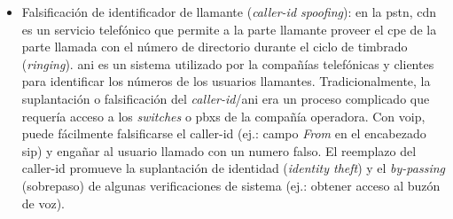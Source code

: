 \documentclass[a4paper,12pt]{report}
\begin{document}
\begin{itemize}
\item Falsificación de identificador de llamante (\emph{caller-id spoofing}): 
en la \ac{pstn}, \ac{cdn} es un servicio telefónico que permite a la parte llamante proveer el
\ac{cpe} de la parte llamada con el número de directorio durante el ciclo de timbrado
(\emph{ringing}). \ac{ani} es un sistema utilizado por la compañías telefónicas y clientes
para identificar los números de los usuarios llamantes. Tradicionalmente,
la suplantación o falsificación del \emph{caller-id}/\ac{ani} era un proceso complicado que
requería acceso a los \emph{switches} o \ac{pbx}s de la compañía operadora. Con \ac{voip}, puede
fácilmente falsificarse el caller-id (ej.: campo \emph{From} en el encabezado \ac{sip}) y
engañar al usuario llamado con un numero falso. El reemplazo del caller-id
promueve la suplantación de identidad (\emph{identity theft}) y el \emph{by-passing}
(sobrepaso) de algunas verificaciones de sistema (ej.: obtener acceso al buzón
de voz).   


\end{itemize}
\end{document}
